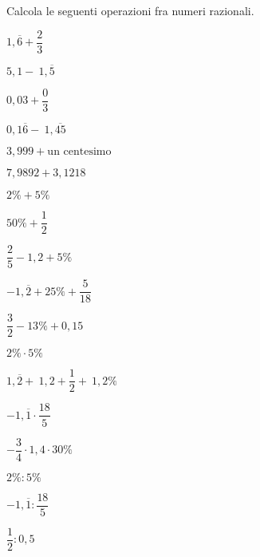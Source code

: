 \pagebreak   %
\begin{esercizio}
\label{ese:3.45}
Calcola le seguenti operazioni fra numeri razionali.

\begin{htmulticols}{3}
\begin{enumeratees}
\spazielenx
\item \(1,\overline{6} +\dfrac{2}{3}\)
\item \(5,1 -~1,\overline{5}\)
\item \(0,03+ \dfrac{0}{3}\)
\item \(0,1\overline{6} -~1,\overline{45}\)
\item \(3,999+ \text{un centesimo}\)
\item \(7,9892+3,1218\)
\item \(2\% + 5\%\)
\item \(50\% + \dfrac{1}{2}\)
\item \(\dfrac{2}{5}-1,2+5\%~\)
\item \(-1,\overline{2}+25\%+\dfrac{5}{18}\)
\item \(\dfrac{3}{2} -13\% +0,15\)
\item \(2\% \cdot 5\%\)
\item \(1,\overline{2} +~1,2 + \dfrac{1}{2} +~1,2\%~\)
% 
% 
\item \(-1,\overline{1} \cdot \dfrac{18}{5}\)
\item \(-\dfrac{3}{4} \cdot 1,4 \cdot 30\%\)
\item \(2\% : 5\%\)
% 
% 
\item \(-1,\overline{1} : \dfrac{18}{5}\)
\item \(\dfrac{1}{2} : 0,5\)
\end{enumeratees}
\end{htmulticols}
\end{esercizio}

